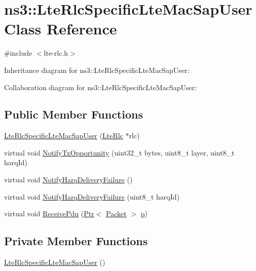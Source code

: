 \hypertarget{classns3_1_1LteRlcSpecificLteMacSapUser}{}\section{ns3\+:\+:Lte\+Rlc\+Specific\+Lte\+Mac\+Sap\+User Class Reference}
\label{classns3_1_1LteRlcSpecificLteMacSapUser}


{\ttfamily \#include $<$lte-\/rlc.\+h$>$}



Inheritance diagram for ns3\+:\+:Lte\+Rlc\+Specific\+Lte\+Mac\+Sap\+User\+:


Collaboration diagram for ns3\+:\+:Lte\+Rlc\+Specific\+Lte\+Mac\+Sap\+User\+:
\subsection*{Public Member Functions}
\begin{DoxyCompactItemize}
\item 
\hyperlink{classns3_1_1LteRlcSpecificLteMacSapUser_a0ae3b5d15ccf0f395490cdbf6c8b5329}{Lte\+Rlc\+Specific\+Lte\+Mac\+Sap\+User} (\hyperlink{classns3_1_1LteRlc}{Lte\+Rlc} $\ast$rlc)
\item 
virtual void \hyperlink{classns3_1_1LteRlcSpecificLteMacSapUser_a0303422038ce32476fee5b11109f94a6}{Notify\+Tx\+Opportunity} (uint32\+\_\+t bytes, uint8\+\_\+t layer, uint8\+\_\+t harq\+Id)
\item 
virtual void \hyperlink{classns3_1_1LteRlcSpecificLteMacSapUser_a0f2203321f8e1b36b56617e809423882}{Notify\+Harq\+Delivery\+Failure} ()
\item 
virtual void \hyperlink{classns3_1_1LteRlcSpecificLteMacSapUser_a8b9aadc43ba7c49620523ee9012e9981}{Notify\+Harq\+Delivery\+Failure} (uint8\+\_\+t harq\+Id)
\item 
virtual void \hyperlink{classns3_1_1LteRlcSpecificLteMacSapUser_af0de831da82d5390666dc9fb8a7108d6}{Receive\+Pdu} (\hyperlink{classns3_1_1Ptr}{Ptr}$<$ \hyperlink{classns3_1_1Packet}{Packet} $>$ \hyperlink{lte__link__budget__x2__handover__measures_8m_ac9de518908a968428863f829398a4e62}{p})
\end{DoxyCompactItemize}
\subsection*{Private Member Functions}
\begin{DoxyCompactItemize}
\item 
\hyperlink{classns3_1_1LteRlcSpecificLteMacSapUser_a9fc4748cc48248ed32b15cc93ade3697}{Lte\+Rlc\+Specific\+Lte\+Mac\+Sap\+User} ()
\end{DoxyCompactItemize}
